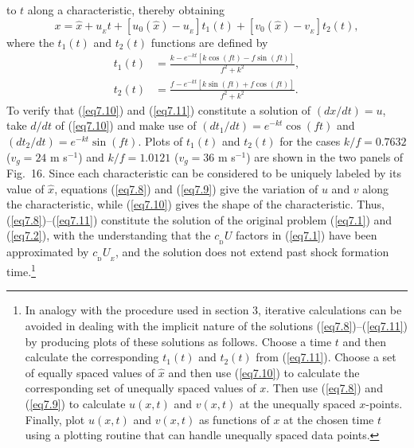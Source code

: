 \documentclass[10pt]{article}
\newcommand{\cD}{c_{_\mathrm{D}}}
\begin{document}
to $t$ along a characteristic, thereby obtaining
\begin{equation}                                  %
       x = \hat{x} + u_{_E}t + [u_0(\hat{x})-u_{_E}]t_1(t) + [v_0(\hat{x})-v_{_E}]t_2(t),
\label{eq7.10}
\end{equation}
where the $t_1(t)$ and $t_2(t)$ functions are defined by
\begin{equation}                                  %
  \begin{split}
        t_1(t) &= \frac{k - e^{-kt}[k\cos(ft) - f\sin(ft)]}{f^2 + k^2},   \\
        t_2(t) &= \frac{f - e^{-kt}[k\sin(ft) + f\cos(ft)]}{f^2 + k^2}.
  \end{split}
\label{eq7.11}
\end{equation}
To verify that (\ref{eq7.10}) and (\ref{eq7.11}) constitute a solution of $(dx/dt)=u$,
take $d/dt$ of (\ref{eq7.10}) and make use of $(dt_1/dt)=e^{-kt}\cos(ft)$ and
$(dt_2/dt)=e^{-kt}\sin(ft)$.
Plots of $t_1(t)$ and $t_2(t)$ for the cases $k/f=0.7632$ ($v_g=24$  m s$^{-1}$)
and $k/f=1.0121$ ($v_g=36$  m s$^{-1}$) are shown
in the two panels of Fig.~16. Since each characteristic can be
considered to be uniquely labeled by its value of $\hat{x}$, equations (\ref{eq7.8})
and (\ref{eq7.9}) give the variation of $u$ and $v$ along the characteristic, while
(\ref{eq7.10}) gives the shape of the characteristic. Thus, (\ref{eq7.8})--(\ref{eq7.11})
constitute the solution of the original problem (\ref{eq7.1}) and (\ref{eq7.2}), with
the understanding that the $\cD U$ factors in (\ref{eq7.1}) have been approximated
by $\cD U_{_E}$, and the solution does not extend past shock formation
time.\footnote{In analogy with the procedure used in section 3, iterative calculations
can be avoided in dealing with the implicit nature of the solutions
(\ref{eq7.8})--(\ref{eq7.11}) by producing plots of these solutions as follows.
Choose a time $t$ and then calculate the corresponding $t_1(t)$ and $t_2(t)$
from (\ref{eq7.11}). Choose a set of equally spaced values of $\hat{x}$ and then
use (\ref{eq7.10}) to calculate the corresponding set of unequally spaced values
of $x$. Then use (\ref{eq7.8}) and (\ref{eq7.9}) to calculate $u(x,t)$ and $v(x,t)$
at the unequally spaced $x$-points. Finally, plot $u(x,t)$ and $v(x,t)$ as functions
of $x$ at the chosen time $t$ using a plotting routine that can handle unequally spaced
data points.}
\end{document}
